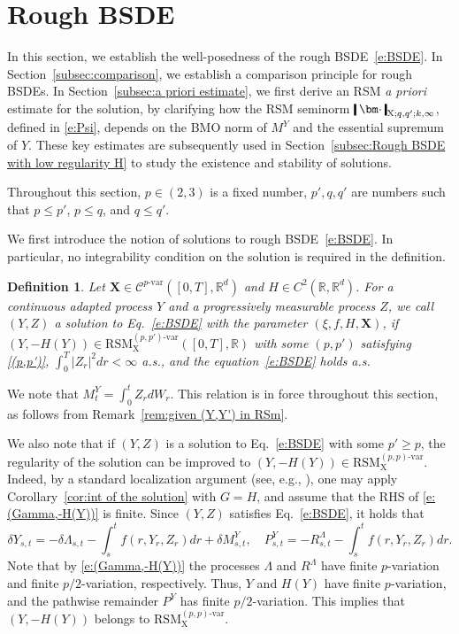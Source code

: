 \documentclass[11pt,reqno]{amsart}
\newtheorem{definition}[lemma]{Definition}
\numberwithin{equation}{section}
\def\R{\mathbb R}
\newcommand{\shortthickbar}{%
  \vcenter{\hbox{\rule{1.8pt}{2.2ex}}}%
}
\newcommand{\thicknm}[1]{%
  \mathopen{\shortthickbar}%
  \mkern4mu #1 \mkern4mu%
  \mathclose{\shortthickbar}%
}
\begin{document}

\section{Rough BSDE}\label{sec:Rough BSDE}

In this section, we establish the well-posedness of the rough BSDE~\eqref{e:BSDE}. In Section~\ref{subsec:comparison}, we establish a comparison principle for rough BSDEs. In Section~\ref{subsec:a priori estimate}, we first derive an RSM \emph{a priori} estimate for the solution, by clarifying how the \textrm{RSM} seminorm $\thicknm{\bm\cdot}_{\mathrm X;q,q';k,\infty}$, defined in \eqref{e:Psi}, depends on the \textrm{BMO} norm of $M^Y$ and the essential supremum of $Y$.  
These key estimates are subsequently used in Section~\ref{subsec:Rough BSDE with low regularity H} to study the existence and stability of solutions. 

Throughout this section, $p\in(2,3)$ is a fixed number, $p',q,q'$ are numbers such that $p \le p'$, $p \le q$, and $q \le q'$.

We first introduce the notion of solutions to rough BSDE~\eqref{e:BSDE}. In particular, no integrability condition on the solution is required in the definition.


\begin{definition}\label{def:def of BSDEs}
Let $\mathbf X\in \mathscr{C}^{p\text{-}\mathrm{var}}([0,T],\R^d)$ and $H \in C^{2}(\R,\R^d)$. For a continuous adapted process $Y$ and a progressively measurable process $Z$, we call $(Y,Z)$ a solution to Eq.~\eqref{e:BSDE} with the parameter $(\xi,f,H,\mathbf X)$, if $(Y,-H(Y)) \in \mathrm{RSM}^{(p,p')\text{-}\mathrm{var}}_{\mathrm X}([0,T],\R)$ with some $(p,p')$ satisfying \ref{(p,p')}, $\int_{0}^{T} |Z_r|^2 dr < \infty$ a.s., and the equation~\eqref{e:BSDE} holds a.s.  
\end{definition}

We note that $M^Y_t = \int_0^t Z_r dW_r$. This relation is in force throughout this section, as follows from Remark~\ref{rem:given (Y,Y') in RSm}.

We also note that if $(Y,Z)$ is a solution to Eq.~\eqref{e:BSDE} with some $p'\ge p$, the regularity of the solution can be improved to $(Y,-H(Y)) \in \mathrm{RSM}^{(p,p)\text{-}\mathrm{var}}_{\mathrm X}$. Indeed, by a standard localization argument (see, e.g., \cite[Lemma~4.7]{dause2026controlled}), one may apply Corollary~\ref{cor:int of the solution} with $G = H$, and assume that the RHS of \eqref{e:(Gamma,-H(Y))} is finite. Since $(Y,Z)$ satisfies Eq.~\eqref{e:BSDE}, it holds that    
\begin{equation*}
\delta Y_{s,t} = -\delta \Lambda_{s,t} - \int_{s}^{t} f(r,Y_r,Z_r) dr + \delta M^{Y}_{s,t}, \quad P^{Y}_{s,t} = -R^{\Lambda}_{s,t} - \int_{s}^{t} f(r,Y_r,Z_r) dr.
\end{equation*}
Note that by \eqref{e:(Gamma,-H(Y))} the processes $\Lambda$ and $R^{\Lambda}$ have finite $p$-variation and finite $p/2$-variation, respectively. Thus, $Y$ and $H(Y)$ have finite $p$-variation, and the pathwise remainder $P^Y$ has finite $p/2$-variation. 
This implies that $(Y,-H(Y))$ belongs to $\mathrm{RSM}^{(p,p)\text{-}\mathrm{var}}_{\mathrm X}$.
\end{document}

